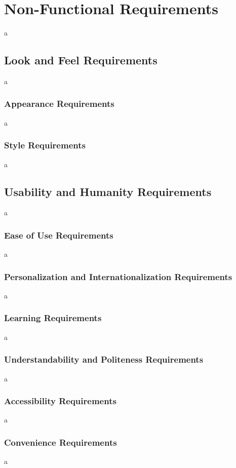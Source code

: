 \documentclass[12pt]{article}
\begin{document}
\section{Non-Functional Requirements}
a

\subsection{Look and Feel Requirements}
a

\subsubsection{Appearance Requirements}
a

\subsubsection{Style Requirements}
a

\subsection{Usability and Humanity Requirements}
a

\subsubsection{Ease of Use Requirements}
a

\subsubsection{Personalization and Internationalization Requirements}
a

\subsubsection{Learning Requirements}
a

\subsubsection{Understandability and Politeness Requirements}
a

\subsubsection{Accessibility Requirements}
a

\subsubsection{Convenience Requirements}
a
\end{document}
